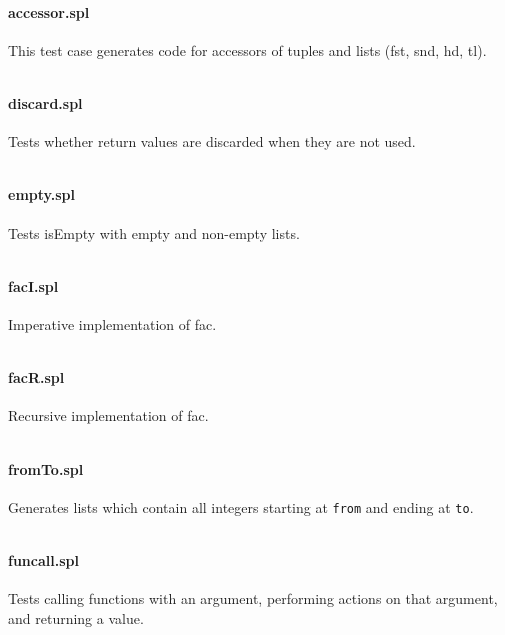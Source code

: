 \documentclass[a4paper]{article}
\begin{document}
\paragraph{accessor.spl}
This test case generates code for accessors of tuples and lists (fst, snd, hd, tl).
\begin{verbatim}\end{verbatim}

\paragraph{discard.spl}
Tests whether return values are discarded when they are not used.
\begin{verbatim}\end{verbatim}

\paragraph{empty.spl}
Tests isEmpty with empty and non-empty lists.
\begin{verbatim}\end{verbatim}

\paragraph{facI.spl}
Imperative implementation of fac.
\begin{verbatim}\end{verbatim}

\paragraph{facR.spl}
Recursive implementation of fac.
\begin{verbatim}\end{verbatim}

\paragraph{fromTo.spl}
Generates lists which contain all integers starting at \verb|from| and ending at \verb|to|.
\begin{verbatim}\end{verbatim}

\paragraph{funcall.spl}
Tests calling functions with an argument, performing actions on that argument, and returning a value.
\begin{verbatim}\end{verbatim}
\end{document}
